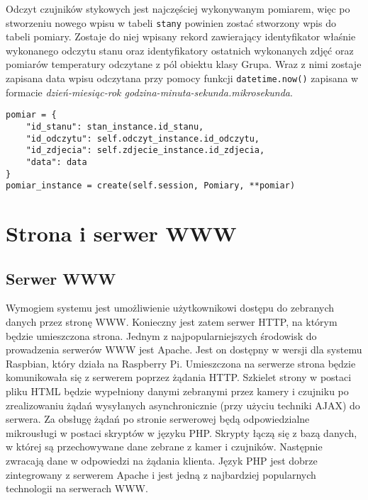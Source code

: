 \documentclass[a4paper,11pt,twoside]{article}
\begin{document}
Odczyt czujników stykowych jest najczęściej wykonywanym pomiarem, więc po stworzeniu nowego wpisu w tabeli \texttt{stany} powinien zostać stworzony wpis do tabeli pomiary. Zostaje do niej wpisany rekord zawierający identyfikator właśnie wykonanego odczytu stanu oraz identyfikatory ostatnich wykonanych zdjęć oraz pomiarów temperatury odczytane z pól obiektu klasy Grupa. Wraz z nimi zostaje zapisana data wpisu odczytana przy pomocy funkcji \texttt{datetime.now()} zapisana w formacie \textit{dzień-miesiąc-rok godzina-minuta-sekunda.mikrosekunda}.
\begin{lstlisting}
pomiar = {
	"id_stanu": stan_instance.id_stanu,
	"id_odczytu": self.odczyt_instance.id_odczytu,
	"id_zdjecia": self.zdjecie_instance.id_zdjecia,
	"data": data
}
pomiar_instance = create(self.session, Pomiary, **pomiar)
\end{lstlisting}

\newpage

\section{Strona i serwer WWW}

\subsection{Serwer WWW}
Wymogiem systemu jest umożliwienie użytkownikowi dostępu do zebranych danych przez stronę WWW. Konieczny jest zatem serwer HTTP, na którym będzie umieszczona strona. Jednym z najpopularniejszych środowisk do prowadzenia serwerów WWW jest Apache. Jest on dostępny w wersji dla systemu Raspbian, który działa na Raspberry Pi. Umieszczona na serwerze strona będzie komunikowała się z serwerem poprzez żądania HTTP. Szkielet strony w postaci pliku HTML będzie wypełniony danymi zebranymi przez kamery i czujniku po zrealizowaniu żądań wysyłanych asynchronicznie (przy użyciu techniki AJAX) do serwera. Za obsługę żądań po stronie serwerowej będą odpowiedzialne mikrousługi w postaci skryptów w języku PHP. Skrypty łączą się z bazą danych, w której są przechowywane dane zebrane z kamer i czujników. Następnie zwracają dane w odpowiedzi na żądania klienta. Język PHP jest dobrze zintegrowany z serwerem Apache i jest jedną z najbardziej popularnych technologii na serwerach WWW.
\end{document}
